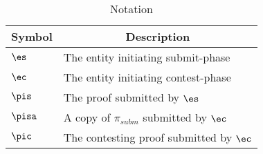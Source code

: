 \begin{table}[H]
\begin{tabular}{ll}
\hline
\multicolumn{1}{|c|}{Symbol} & \multicolumn{1}{c|}{Description} \\ \hline
$\es$      & The entity initiating submit-phase \\
$\ec$      & The entity initiating contest-phase \\
$\pis$    & The proof submitted by $\es$ \\
$\pisa$   & A copy of $\pi_{subm}$ submitted by $\ec$ \\
$\pic$    & The contesting proof submitted by $\ec$ \\

\end{tabular}
\centering
\caption{Notation}
\label{table:notation_verifier}
\end{table}
